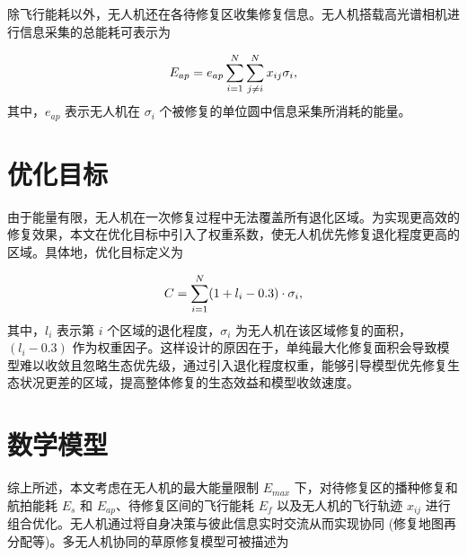 \documentclass[AutoFakeBold]{LZUThesis}
\begin{document}
除飞行能耗以外，无人机还在各待修复区收集修复信息。无人机搭载高光谱相机进行信息采集的总能耗可表示为

\begin{equation} \label{hyper-spectral-camera-energy}
	\begin{scriptsize}
		E_{ap} = e_{ap}\sum^N_{i=1}\sum^N_{j \neq i} x_{ij}\sigma_i,
	\end{scriptsize}
\end{equation}
其中，$e_{ap}$ 表示无人机在 $\sigma_i$ 个被修复的单位圆中信息采集所消耗的能量。

\section{优化目标}

由于能量有限，无人机在一次修复过程中无法覆盖所有退化区域。为实现更高效的修复效果，本文在优化目标中引入了权重系数，使无人机优先修复退化程度更高的区域。具体地，优化目标定义为

\begin{equation} \label{maximize-weighted-sum}
	\begin{small}
		C = \sum_{i=1}^{N} (1+ l_i - 0.3) \cdot \sigma_i,
	\end{small}
\end{equation}
其中，$l_i$ 表示第 $i$ 个区域的退化程度，$\sigma_i$ 为无人机在该区域修复的面积，$(l_i - 0.3)$ 作为权重因子。这样设计的原因在于，单纯最大化修复面积会导致模型难以收敛且忽略生态优先级，通过引入退化程度权重，能够引导模型优先修复生态状况更差的区域，提高整体修复的生态效益和模型收敛速度。

\section{数学模型}

综上所述，本文考虑在无人机的最大能量限制 $E_{max}$ 下，对待修复区的播种修复和航拍能耗 $E_s$ 和 $E_{ap}$、待修复区间的飞行能耗 $E_f$ 以及无人机的飞行轨迹 $x_{ij}$ 进行组合优化。无人机通过将自身决策与彼此信息实时交流从而实现协同 (修复地图再分配等)。多无人机协同的草原修复模型可被描述为
\end{document}
